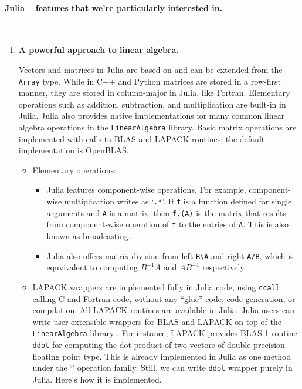 \paragraph{Julia -- features that we're particularly interested in.} ~ 
\begin{enumerate} 
\item {\bf A powerful approach to linear algebra.}

Vectors and matrices in Julia are based on and can be extended from the {\tt Array} type. 
While in C++ and Python matrices are stored in a row-first manner, they are stored in column-major in Julia, like Fortran. Elementary operations such as addition, subtraction, and multiplication are built-in in Julia.
Julia also provides native implementations 
for many common linear algebra operations in the \texttt{LinearAlgebra} library. 
Basic matrix operations are implemented with calls to 
BLAS and LAPACK routines; the default implementation is OpenBLAS. 
\begin{itemize} 
    \item Elementary operations:
    
    \begin{itemize}
    	\item Julia features component-wise operations. For example, component-wise multiplication writes as `{\tt .*}'. If {\tt f} is a function defined for single arguments and {\tt A} is a matrix, then {\tt f.(A)} is the matrix that results from component-wise operation of {\tt f} to the entries of {\tt A}. This is also known as broadcasting.

		\item Julia also offers matrix division from left {\tt B\textbackslash A} and right {\tt A/B}, which is equvivalent to computing $B^{-1}A$ and $AB^{-1}$ respectively. 
    
    \end{itemize}
    
    \item 
    LAPACK wrappers are implemented fully in Julia code, using \texttt{ccall} \textemdash{} calling C and Fortran code, without any ``glue'' code, code generation, or compilation. 
    All LAPACK routines are available in Julia. Julia users can write user-extensible wrappers 
    for BLAS and LAPACK on top of the \texttt{LinearAlgebra} library \cite{bezanson2017julia}. For instance, LAPACK provides BLAS-1 routine {\tt ddot} for computing the dot product of two vectors of double precision floating point type. This is already implemented in Julia as one method under the `{\tt *}' operation family. Still, we can write {\tt ddot} wrapper purely in Julia. Here's how it is implemented.  


\end{itemize}
\end{enumerate}
